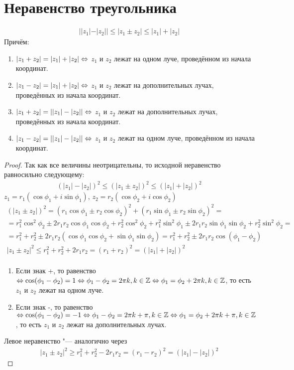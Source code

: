 \section{Неравенство треугольника}

\begin{theorem}{} 
\begin{gather*}
||z_1| - |z_2|| \leqslant |z_1 \pm z_2| \leqslant |z_1| + |z_2|
\end{gather*}
Причём:
\begin{enumerate}
	\item $|z_1 + z_2| = |z_1| + |z_2| \Leftrightarrow$ $z_1$ и $z_2$ лежат на одном луче, проведённом из начала координат.
	\item $|z_1 - z_2| = |z_1| + |z_2| \Leftrightarrow$ $z_1$ и $z_2$ лежат на дополнительных лучах, проведённых из начала координат.
	\item $|z_1 + z_2| = ||z_1| - |z_2|| \Leftrightarrow$ $z_1$ и $z_2$ лежат на дополнительных лучах, проведённых из начала координат.
	\item $|z_1 - z_2| = ||z_1| - |z_2|| \Leftrightarrow$ $z_1$ и $z_2$ лежат на одном луче, проведённом из начала координат.
\end{enumerate} 
\end{theorem}
\begin{proof}
Так как все величины неотрицательны, то исходной неравенство равносильно следующему:
\begin{gather*}
(|z_1|-|z_2|)^2 \leqslant (|z_1 \pm z_2|)^2 \leqslant (|z_1| + |z_2|)^2
\end{gather*}
$z_1 = r_1(\cos \phi_1 + i \sin \phi_1)$, $z_2 = r_2(\cos \phi_2 + i \cos \phi_2)$
\begin{gather*}
(|z_1 \pm z_2|)^2 = (r_1 \cos \phi_1 \pm r_2 \cos \phi_2)^2 + (r_1 \sin \phi_1 \pm r_2 \sin \phi_2)^2 = \\
= r_1^2 \cos^2 \phi_2 \pm 2r_1r_2 \cos \phi_1 \cos \phi_2 + r_2^2 \cos^2 \phi_2 + r_1^2 \sin^2 \phi_1 \pm 2r_1r_2 \sin \phi_1 \sin \phi_2 + r_2^2 \sin^2 \phi_2 = \\
= r_1^2 + r_2 ^2 \pm 2r_1r_2(\cos \phi_1 \cos \phi_2 + \sin \phi_1 \sin \phi_2) = r_1^2 + r_2^2 \pm 2r_1r_2 \cos(\phi_1 - \phi_2) \\
|z_1 \pm z_2|^2 \leqslant r_1^2 + r_2^2 + 2r_1r_2 = (r_1 + r_2)^2 = (|z_1| + |z_2|)^2 \\
\end{gather*}
\begin{enumerate}
	\item Если знак +, то равенство $\Leftrightarrow \cos(\phi_1 - \phi_2) = 1 \Leftrightarrow \phi_1 - \phi_2 = 2 \pi k, k \in \mathbb{Z} \Leftrightarrow \phi_1 = \phi_2 + 2 \pi k, k \in \mathbb{Z}$, то есть $z_1$ и $z_2$ лежат на одном луче.
	\item Если знак -, то равенство $\Leftrightarrow \cos(\phi_1 - \phi_2) = -1 \Leftrightarrow \phi_1 - \phi_2 = 2 \pi k + \pi, k \in \mathbb{Z} \Leftrightarrow \phi_1 = \phi_2 + 2 \pi k + \pi, k \in \mathbb{Z}$, то есть $z_1$ и $z_2$ лежат на дополнительных лучах.
\end{enumerate}
Левое неравенство "--- аналогично через
\begin{gather*}
|z_1 \pm z_2|^2 \geqslant r_1^2 + r_2^2 - 2r_1r_2 = (r_1 - r_2)^2 = (|z_1| - |z_2|)^2
\end{gather*}
\end{proof}